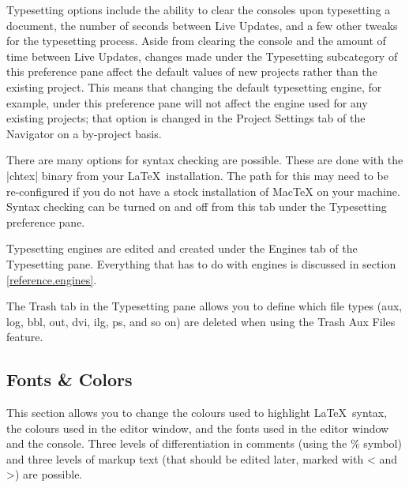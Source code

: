 Typesetting options include the ability to clear the consoles upon typesetting a document, the number of seconds between Live Updates, and a few other tweaks for the typesetting process. Aside from clearing the console and the amount of time between Live Updates, changes made under the Typesetting subcategory of this preference pane affect the default values of new projects rather than the existing project. This means that changing the default typesetting engine, for example, under this preference pane will not affect the engine used for any existing projects; that option is changed in the Project Settings tab of the Navigator on a by-project basis.

There are many options for syntax checking are possible. These are done with the |chtex| binary from your \LaTeX\ installation. The path for this may need to be re-configured if you do not have a stock installation of MacTeX on your machine. Syntax checking can be turned on and off from this tab under the Typesetting preference pane.

Typesetting engines are edited and created under the Engines tab of the Typesetting pane. Everything that has to do with engines is discussed in section \ref{reference.engines}.

The Trash tab in the Typesetting pane allows you to define which file types (aux, log, bbl, out, dvi, ilg, ps, and so on) are deleted when using the Trash Aux Files feature.

\subsection{Fonts \& Colors}
\label{reference.prefs.fontcol}
This section allows you to change the colours used to highlight \LaTeX\ syntax, the colours used in the editor window, and the fonts used in the editor window and the console. Three levels of differentiation in comments (using the \% symbol) and three levels of markup text (that should be edited later, marked with {\textless} and {\textgreater}) are possible.


